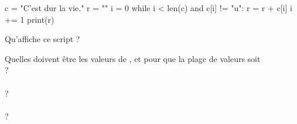 \documentclass[a4paper,12pt]{article}
\begin{document}
\begin{multicols}{2}



\begin{pythoncode}
c = "C'est dur la vie."
r = ""
i = 0
while i < len(c) and c[i] != "u":
    r = r + c[i]
    i += 1
print(r)
        \end{pythoncode}
    Qu'affiche ce script ?\\

\end{multicols}

Quelles doivent être les valeurs de ,  et  pour que la plage de valeurs  soit\\

 ? \\

\\

 ? \\

\\

 ? \\

\\
\end{document}
